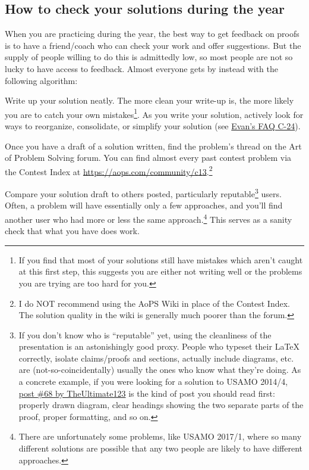 \documentclass[11pt]{scrartcl}
\begin{document}
\subsection{How to check your solutions during the year}
When you are practicing during the year,
the best way to get feedback on proofs is to have a friend/coach
who can check your work and offer suggestions.
But the supply of people willing to do this is admittedly low,
so most people are not so lucky to have access to feedback.
Almost everyone gets by instead with the following algorithm:
\begin{description}
  \ii[Step 1.] Write up your solution neatly.
  The more clean your write-up is, the more likely you are to catch
  your own mistakes\footnote{If you find that most of your solutions
    still have mistakes which aren't caught at this first step,
    this suggests you are either not writing well
    or the problems you are trying are too hard for you.}.
  As you write your solution, actively look for ways to
  reorganize, consolidate, or simplify your solution
  (see \href{https://web.evanchen.cc/faq-contest.html#C-24}{Evan's FAQ C-24}).

  \ii[Step 2.] Once you have a draft of a solution written,
  find the problem's thread on the Art of Problem Solving forum.
  You can find almost every past contest problem via the Contest Index at
  \url{https://aops.com/community/c13}.\footnote{I
    do NOT recommend using the AoPS Wiki in place of the Contest Index.
    The solution quality in the wiki is generally much poorer than the forum.}

  Compare your solution draft to others posted,
  particularly reputable\footnote{If you don't know who is ``reputable'' yet,
    using the cleanliness of the presentation is an astonishingly good proxy.
    People who typeset their LaTeX correctly,
    isolate claims/proofs and sections, actually include diagrams, etc.
    are (not-so-coincidentally) usually the ones who know what they're doing.
    As a concrete example, if you were looking for a solution to USAMO 2014/4,
    \href{https://aops.com/community/p15752333}{post \#68 by TheUltimate123}
    is the kind of post you should read first: properly drawn diagram,
    clear headings showing the two separate parts of the proof,
    proper formatting, and so on.} users.
  Often, a problem will have essentially only a few approaches,
  and you'll find another user who had more or less
  the same approach.\footnote{There are unfortunately some problems,
    like USAMO 2017/1, where so many different solutions are possible
    that any two people are likely to have different approaches.}
  This serves as a sanity check that what you have does work.


\end{description}
\end{document}
